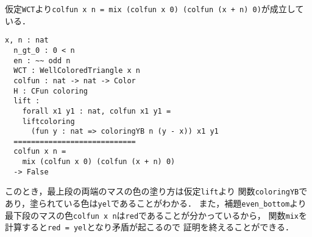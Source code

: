 仮定{\tt{WCT}}より{\tt{colfun x n = mix (colfun x 0) (colfun (x + n) 0)}}が成立している．
\begin{lstlisting}[language=Coq]
  x, n : nat
  n_gt_0 : 0 < n
  en : ~~ odd n
  WCT : WellColoredTriangle x n
  colfun : nat -> nat -> Color
  H : CFun coloring
  lift :
    forall x1 y1 : nat, colfun x1 y1 =
    liftcoloring
      (fun y : nat => coloringYB n (y - x)) x1 y1
  ============================
  colfun x n =
    mix (colfun x 0) (colfun (x + n) 0)
  -> False
\end{lstlisting}
このとき，最上段の両端のマスの色の塗り方は仮定{\tt{lift}}より
関数{\tt{coloringYB}}であり，塗られている色は{\tt{yel}}であることがわかる．
また，補題{\tt{even\_bottom}}より
最下段のマスの色{\tt{colfun x n}}は{\tt{red}}であることが分かっているから，
関数{\tt{mix}}を計算すると{\tt{red = yel}}となり矛盾が起こるので
証明を終えることができる．

